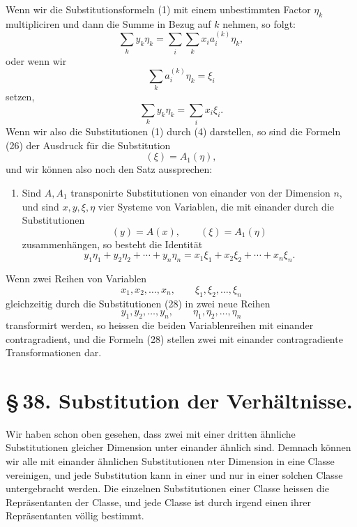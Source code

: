 \documentclass[11pt]{article}
\begin{document}
Wenn wir die Substitutionsformeln (1) mit einem unbestimmten Factor $\eta_k$ multipliciren und dann die Summe in Bezug auf $k$ nehmen, so folgt:
\begin{equation}
\sum_k y_k\eta_k=\sum_i\sum_k x_i a_i^{(k)}\eta_k,
\tag{25}
\end{equation}
oder wenn wir
\begin{equation}
\sum_k a_i^{(k)}\eta_k=\xi_i
\tag{26}
\end{equation}
setzen,
\begin{equation}
\sum_k y_k\eta_k=\sum_i x_i\xi_i.
\tag{27}
\end{equation}
Wenn wir also die Substitutionen (1) durch (4) darstellen, so sind die Formeln (26) der Ausdruck für die Substitution
\[
(\xi)=A_1(\eta),
\]
und wir können also noch den Satz aussprechen:

\begin{enumerate}[label=\arabic*.,leftmargin=2.2em,start=9]
\item Sind $A,A_1$ transponirte Substitutionen von einander von der Dimension $n$, und sind $x,y,\xi,\eta$ vier Systeme von Variablen, die mit einander durch die Substitutionen
\begin{equation}
(y)=A(x),\qquad (\xi)=A_1(\eta)
\tag{28}
\end{equation}
zusammenhängen, so besteht die Identität
\begin{equation}
y_1\eta_1+y_2\eta_2+\cdots+y_n\eta_n
=x_1\xi_1+x_2\xi_2+\cdots+x_n\xi_n.
\tag{29}
\end{equation}
\end{enumerate}

Wenn zwei Reihen von Variablen
\[
x_1,x_2,\ldots,x_n,\qquad \xi_1,\xi_2,\ldots,\xi_n
\]
gleichzeitig durch die Substitutionen (28) in zwei neue Reihen
\[
y_1,y_2,\ldots,y_n,
\qquad
\eta_1,\eta_2,\ldots,\eta_n
\]
transformirt werden, so heissen die beiden Variablenreihen mit einander contragradient, und die Formeln (28) stellen zwei mit einander contragradiente Transformationen dar.

\section*{\S\,38. Substitution der Verhältnisse.}

Wir haben schon oben gesehen, dass zwei mit einer dritten ähnliche Substitutionen gleicher Dimension unter einander ähnlich sind. Demnach können wir alle mit einander ähnlichen Substitutionen $n$ter Dimension in eine Classe vereinigen, und jede Substitution kann in einer und nur in einer solchen Classe untergebracht werden. Die einzelnen Substitutionen einer Classe heissen die Repräsentanten der Classe, und jede Classe ist durch irgend einen ihrer Repräsentanten völlig bestimmt.
\end{document}
